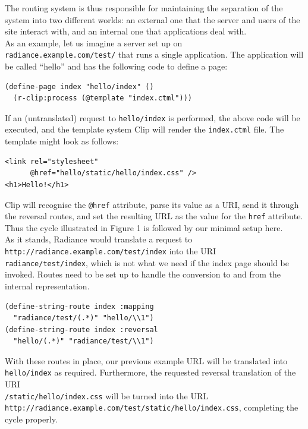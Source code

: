 \documentclass{sig-alternate-05-2015}
\begin{document}
The routing system is thus responsible for maintaining the separation of the system into two different worlds: an external one that the server and users of the site interact with, and an internal one that applications deal with. \\

As an example, let us imagine a server set up on \\ \texttt{radiance.example.com/test/} that runs a single application. The application will be called ``hello'' and has the following code to define a page:

\begin{verbatim}
(define-page index "hello/index" ()
  (r-clip:process (@template "index.ctml")))
\end{verbatim}

If an (untranslated) request to \texttt{hello/index} is performed, the above code will be executed, and the template system Clip will render the \texttt{index.ctml} file. The template might look as follows:

\begin{verbatim}
<link rel="stylesheet"
      @href="hello/static/hello/index.css" />
<h1>Hello!</h1>
\end{verbatim}

Clip will recognise the \texttt{@href} attribute, parse its value as a URI, send it through the reversal routes, and set the resulting URL as the value for the \texttt{href} attribute. Thus the cycle illustrated in Figure 1 is followed by our minimal setup here. \\

As it stands, Radiance would translate a request to \\ \texttt{http://radiance.example.com/test/index} into the URI \\\texttt{radiance/test/index}, which is not what we need if the index page should be invoked. Routes need to be set up to handle the conversion to and from the internal representation.

\begin{verbatim}
(define-string-route index :mapping 
  "radiance/test/(.*)" "hello/\\1")
(define-string-route index :reversal
  "hello/(.*)" "radiance/test/\\1")
\end{verbatim}

With these routes in place, our previous example URL will be translated into \texttt{hello/index} as required. Furthermore, the requested reversal translation of the URI \\\texttt{/static/hello/index.css} will be turned into the URL \\\texttt{http://radiance.example.com/test/static/hello/index.css}, completing the cycle properly. \\
\end{document}
